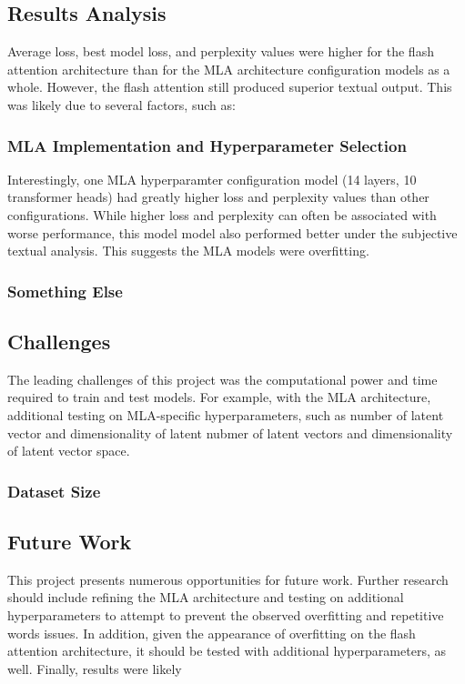 
\subsection{Results Analysis}
Average loss, best model loss, and perplexity values were higher for the flash attention architecture than for the MLA architecture configuration models as a whole. However, the 
flash attention still produced superior textual output.   
This was likely due to several factors, such as:
\subsubsection{MLA Implementation and Hyperparameter Selection}


Interestingly, one MLA hyperparamter configuration model (14 layers, 10 transformer heads) had greatly higher loss and perplexity values than other configurations. 
While higher loss and perplexity can often be associated with worse performance, this model model also performed better under the subjective textual analysis.  
This suggests the MLA models were overfitting.
\subsubsection{Something Else}


\subsection{Challenges}
The leading challenges of this project was the computational power and time required to train and test models. 
For example, with the MLA architecture, additional testing on MLA-specific hyperparameters, such as number of latent vector and dimensionality of latent 
nubmer of latent vectors and dimensionality of latent vector space.  


\subsubsection{Dataset Size}


\subsection{Future Work}
This project presents numerous opportunities for future work. 
Further research should include refining the MLA architecture and testing on additional hyperparameters to attempt to prevent the observed overfitting and repetitive words issues.
In addition, given the appearance of overfitting on the flash attention architecture, it should be tested with additional hyperparameters, as well.
Finally, results were likely 
